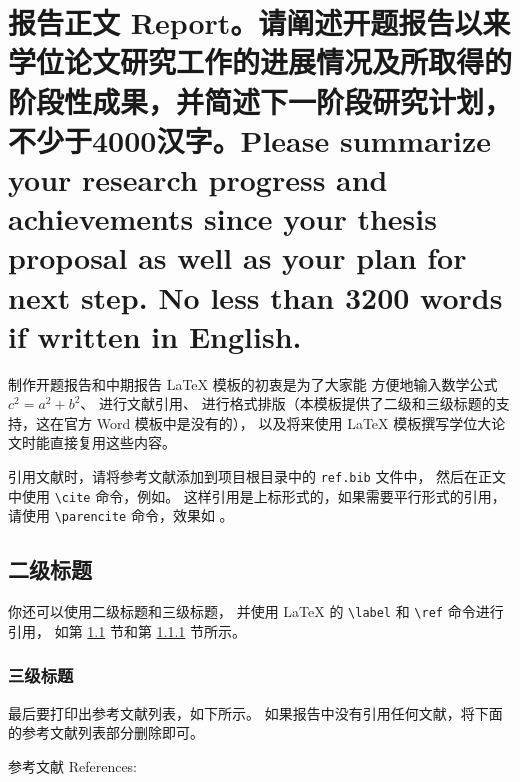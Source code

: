 \documentclass[a4paper,zihao=-4,AutoFakeBold]{ctexart}
\begin{document}
\makecover

\makeinstruction

\makeprojectinfo

\initbodyformat


\section{报告正文 Report。\mdseries 请阐述开题报告以来学位论文研究工作的进展情况及所取得的阶段性成果，并简述下一阶段研究计划，不少于4000汉字。Please summarize your research progress and achievements since your thesis proposal as well as your plan for next step. No less than 3200 words if written in English.}

制作开题报告和中期报告 \LaTeX{} 模板的初衷是为了大家能
方便地输入数学公式 $c^2 = a^2 + b^2$、
进行文献引用\cite{ZJSD}、
进行格式排版（本模板提供了二级和三级标题的支持，这在官方 Word 模板中是没有的），
以及将来使用 \LaTeX{} 模板撰写学位大论文时能直接复用这些内容。


引用文献时，请将参考文献添加到项目根目录中的 \texttt{ref.bib} 文件中，
然后在正文中使用 \verb|\cite| 命令，例如\cite{SPDZ}。
这样引用是上标形式的，如果需要平行形式的引用，请使用
\verb|\parencite| 命令，效果如 \parencite{SPDZ}。


\subsection{二级标题}\label{sub}

你还可以使用二级标题和三级标题，
并使用 \LaTeX{} 的 \verb|\label| 和 \verb|\ref| 命令进行引用，
如第 \ref{sub} 节和第 \ref{subsub} 节所示。



\subsubsection{三级标题}\label{subsub}

最后要打印出参考文献列表，如下所示。
如果报告中没有引用任何文献，将下面的参考文献列表部分删除即可。



\vspace{2\baselineskip}%
{%
  \linespread{1.25}\selectfont    %
  \noindent 参考文献 References:
  \printbibliography[heading=none]
}
\end{document}
